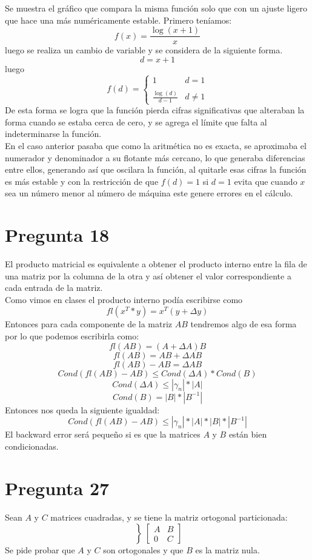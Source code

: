 \documentclass{article}
\begin{document}
\pagebreak
Se muestra el gráfico que compara la misma función solo que con un ajuste ligero que hace una más numéricamente estable. Primero teníamos:
$$f(x) = \frac{\log(x+1)}{x}$$
luego se realiza un cambio de variable y se considera de la siguiente forma.
$$d = x+1 $$
luego 
$$f(d) = \left\lbrace\begin{matrix}
1 &   d = 1\\
\\
\frac{\log(d)}{d-1}&d\neq 1
\end{matrix}\right.$$
De esta forma se logra que la función pierda cifras significativas que alteraban la forma cuando se estaba cerca de cero, y se agrega el límite que falta al indeterminarse la función.\\

En el caso anterior pasaba que como la aritmética no es exacta, se aproximaba el numerador y denominador a su flotante más cercano, lo que generaba diferencias entre ellos, generando así que oscilara la función, al quitarle esas cifras la función es más estable y con la restricción de que $f(d) = 1$ si $d =1$ evita que cuando $x$ sea un número menor al número de máquina este genere errores en el cálculo.
\section*{Pregunta 18}
El producto matricial es equivalente a obtener el producto interno entre la fila de una matriz por la columna de la otra y así obtener el valor correspondiente a cada entrada de la matriz.\\
Como vimos en clases el producto interno podía escribirse como 
$$fl(x^{T}*y)= x^{T}(y+\Delta y)$$
Entonces para cada componente de la matriz $AB$ tendremos algo de esa forma 
por lo que podemos escribirla como:
$$ fl(AB) = (A + \Delta A) B$$
$$ fl (AB) = AB + \Delta AB$$
$$fl(AB)-AB=\Delta AB$$
$$Cond(fl(AB)-AB) \leq Cond(\Delta A)*Cond(B)$$
$$Cond(\Delta A) \leq |\gamma_n|*|A|$$
$$Cond(B)= |B|*|B^{-1}|$$
Entonces nos queda la siguiente igualdad:
$$Cond(fl(AB)-AB)\leq |\gamma_n|*|A|*|B|*|B^{-1}|  $$
El backward error será pequeño si es que la matrices $A$ y $B$ están bien condicionadas.
\section*{Pregunta 27}
Sean $A$ y $C$ matrices cuadradas, y se tiene la matriz ortogonal particionada:
$$\left\rbrace
\begin{bmatrix}
A&B\\
0&C
\end{bmatrix}\right.
$$
Se pide probar que $A$ y $C$ son ortogonales y que $B$ es la matriz nula.\\
\end{document}
